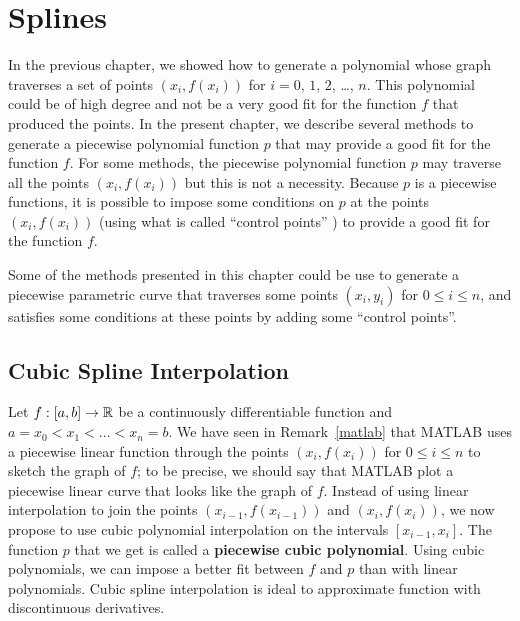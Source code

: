 \chapter{Splines}\label{chaptInterB}

In the previous chapter, we showed how to generate a polynomial
whose graph traverses a set of points $(x_i,f(x_i))$ for $i=0$, $1$,
$2$, \ldots, $n$.  This polynomial could be of high degree and not be a
very good fit for the function $f$ that produced the points.  In the
present chapter, we describe several methods to generate a piecewise
polynomial function $p$ that may provide a good fit for the function $f$.
For some methods, the piecewise polynomial function $p$ may traverse
all the points $(x_i,f(x_i))$ but this is not a necessity.  Because
$p$ is a piecewise functions, it is possible to impose some conditions
on $p$ at the points $(x_i,f(x_i))$ (using what is called ``control
points'' ) to provide a good fit for the function $f$.

Some of the methods presented in this chapter could be use to generate
a piecewise parametric curve that traverses some points $(x_i,y_i)$ for
$0 \leq i \leq n$, and satisfies some conditions at these points by
adding some ``control points''.

\section{Cubic Spline Interpolation} \label{CSI}

Let $f:[a,b]\rightarrow \mathbb{R}$ be a continuously differentiable
function and $a = x_0 < x_1 < \ldots < x_n = b$.  We have seen in
Remark~\ref{matlab} that MATLAB uses a piecewise linear function
through the points $(x_i,f(x_i))$ for $0 \leq i \leq n$ to sketch
the graph of $f$; to be precise, we should say that MATLAB plot a
piecewise linear curve that looks like the graph of $f$.  Instead of
using linear interpolation to join the points $(x_{i-1},f(x_{i-1}))$
and $(x_i,f(x_i))$, we now propose to use cubic polynomial
interpolation on the intervals $[x_{i-1},x_i]$.  The function 
$p$ that we get is called a
{\bfseries piecewise cubic polynomial}.
Using cubic polynomials, we can impose a better fit between $f$ and
$p$ than with linear polynomials.  Cubic spline interpolation is ideal
to approximate function with discontinuous derivatives.

